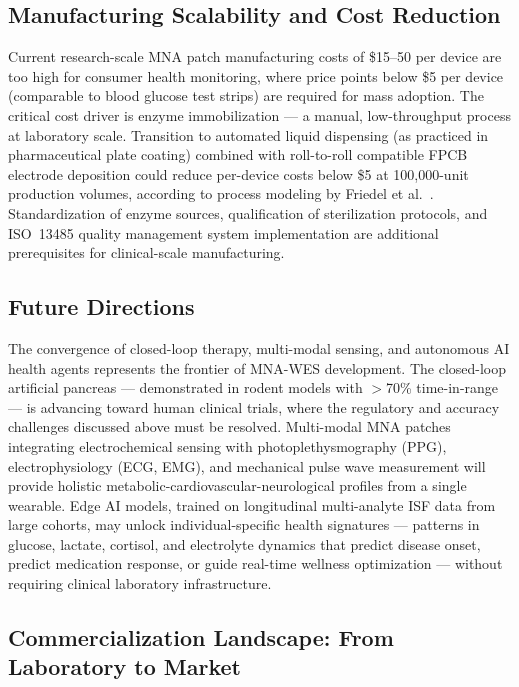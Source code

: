 \documentclass[review,1p]{elsarticle}
\begin{document}
\subsection{Manufacturing Scalability and Cost Reduction}
\label{subsec:cost}

Current research-scale MNA patch manufacturing costs of \$15--50 per device are too high for consumer health monitoring, where price points below \$5 per device (comparable to blood glucose test strips) are required for mass adoption. The critical cost driver is enzyme immobilization — a manual, low-throughput process at laboratory scale. Transition to automated liquid dispensing (as practiced in pharmaceutical plate coating) combined with roll-to-roll compatible FPCB electrode deposition could reduce per-device costs below \$5 at 100,000-unit production volumes, according to process modeling by Friedel et al.\ \cite{Friedel2023}. Standardization of enzyme sources, qualification of sterilization protocols, and ISO~13485 quality management system implementation are additional prerequisites for clinical-scale manufacturing.

\subsection{Future Directions}
\label{subsec:future}

The convergence of closed-loop therapy, multi-modal sensing, and autonomous AI health agents represents the frontier of MNA-WES development. The closed-loop artificial pancreas — demonstrated in rodent models with $>$70\% time-in-range \cite{Liu2025ClosedLoop} — is advancing toward human clinical trials, where the regulatory and accuracy challenges discussed above must be resolved. Multi-modal MNA patches integrating electrochemical sensing with photoplethysmography (PPG), electrophysiology (ECG, EMG), and mechanical pulse wave measurement will provide holistic metabolic-cardiovascular-neurological profiles from a single wearable. Edge AI models, trained on longitudinal multi-analyte ISF data from large cohorts, may unlock individual-specific health signatures — patterns in glucose, lactate, cortisol, and electrolyte dynamics that predict disease onset, predict medication response, or guide real-time wellness optimization — without requiring clinical laboratory infrastructure.

\subsection{Commercialization Landscape: From Laboratory to Market}
\label{subsec:commercial}
\end{document}
